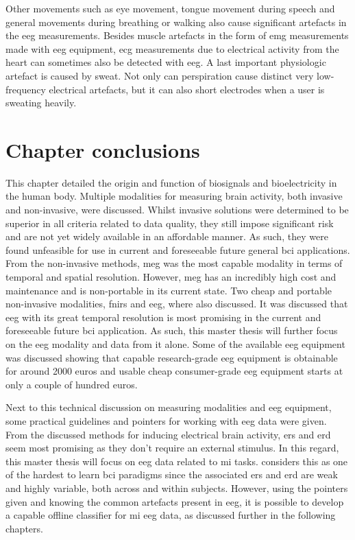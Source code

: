 Other movements such as eye movement, tongue movement during speech and general movements during breathing or walking also cause significant artefacts in the \gls{eeg} measurements.
Besides muscle artefacts in the form of \gls{emg} measurements made with \gls{eeg} equipment, \gls{ecg} measurements due to electrical activity from the heart can sometimes also be detected with \gls{eeg}.
A last important physiologic artefact is caused by sweat.
Not only can perspiration cause distinct very low-frequency electrical artefacts, but it can also short electrodes when a user is sweating heavily.




\section{Chapter conclusions}
\label{sec:biomedical_signals_summary}

This chapter detailed the origin and function of \glspl{biosignal} and bioelectricity in the human body.
Multiple modalities for measuring brain activity, both invasive and non-invasive, were discussed.
Whilst invasive solutions were determined to be superior in all criteria related to data quality, they still impose significant risk and are not yet widely available in an affordable manner.
As such, they were found unfeasible for use in current and foreseeable future general \gls{bci} applications.
From the non-invasive methods, \gls{meg} was the most capable modality in terms of temporal and spatial resolution.
However, \gls{meg} has an incredibly high cost and maintenance and is non-portable in its current state.
Two cheap and portable non-invasive modalities, \gls{fnirs} and \gls{eeg}, where also discussed.
It was discussed that \gls{eeg} with its great temporal resolution is most promising in the current and foreseeable future \gls{bci} application.
As such, this master thesis will further focus on the \gls{eeg} modality and data from it alone.
Some of the available \gls{eeg} equipment was discussed showing that capable research-grade \gls{eeg} equipment is obtainable for around 2000 euros and usable cheap consumer-grade \gls{eeg} equipment starts at only a couple of hundred euros.

Next to this technical discussion on measuring modalities and \gls{eeg} equipment, some practical guidelines and pointers for working with \gls{eeg} data were given.
From the discussed methods for inducing electrical brain activity, \gls{ers} and \gls{erd} seem most promising as they don't require an external stimulus.
In this regard, this master thesis will focus on \gls{eeg} data related to \gls{mi} tasks.
 considers this as one of the hardest to learn \gls{bci} paradigms since the associated \gls{ers} and \gls{erd} are weak and highly variable, both across and within subjects.
However, using the pointers given and knowing the common artefacts present in \gls{eeg}, it is possible to develop a capable offline classifier for \gls{mi} \gls{eeg} data, as discussed further in the following chapters.
